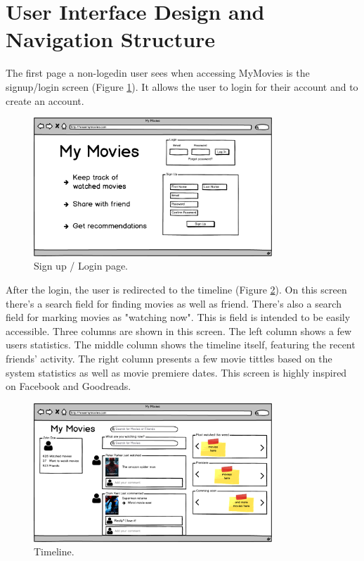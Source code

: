 \section{User Interface Design and Navigation Structure}

The first page a non-logedin user sees when accessing MyMovies is the
signup/login screen (Figure \ref{fig:login}). It allows the user to login for
their account and to create an account.

\begin{figure}[!htb]
\centering
\includegraphics[width=0.8\textwidth]{fig/01-login.png}
\caption{\label{fig:login}Sign up / Login page.}
\end{figure}

After the login, the user is redirected to the timeline (Figure
\ref{fig:timeline}). On this screen there's a search field for finding movies
as well as friend. There's also a search field for marking movies as "watching
now". This is field is intended to be easily accessible. Three columns are
shown in this screen. The left column shows a few users statistics. The middle
column shows the timeline itself, featuring the recent friends' activity. The
right column presents a few movie tittles based on the system statistics as
well as movie premiere dates. This screen is highly inspired on
Facebook\cite{facebook} and Goodreads\cite{goodreads}.

\begin{figure}[!htb]
\centering
\includegraphics[width=0.8\textwidth]{fig/02-timeline.png}
\caption{\label{fig:timeline}Timeline.}
\end{figure}

